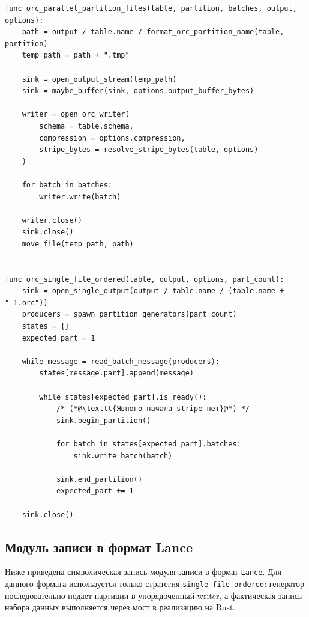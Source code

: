 \begin{lstlisting}[caption={Запись таблицы в формат ORC}]
func orc_parallel_partition_files(table, partition, batches, output, options):
    path = output / table.name / format_orc_partition_name(table, partition)
    temp_path = path + ".tmp"

    sink = open_output_stream(temp_path)
    sink = maybe_buffer(sink, options.output_buffer_bytes)

    writer = open_orc_writer(
        schema = table.schema,
        compression = options.compression,
        stripe_bytes = resolve_stripe_bytes(table, options)
    )

    for batch in batches:
        writer.write(batch)

    writer.close()
    sink.close()
    move_file(temp_path, path)


func orc_single_file_ordered(table, output, options, part_count):
    sink = open_single_output(output / table.name / (table.name + "-1.orc"))
    producers = spawn_partition_generators(part_count)
    states = {}
    expected_part = 1

    while message = read_batch_message(producers):
        states[message.part].append(message)

        while states[expected_part].is_ready():
            /* (*@\texttt{Явного начала stripe нет}@*) */
            sink.begin_partition()

            for batch in states[expected_part].batches:
                sink.write_batch(batch)

            sink.end_partition()
            expected_part += 1

    sink.close()
\end{lstlisting}

\subsection{Модуль записи в формат Lance}

Ниже приведена символическая запись модуля записи в формат \texttt{Lance}. Для
данного формата используется только стратегия
\texttt{single-file-ordered}: генератор последовательно подает партиции в
упорядоченный writer, а фактическая запись набора данных выполняется через
мост в реализацию на Rust.

